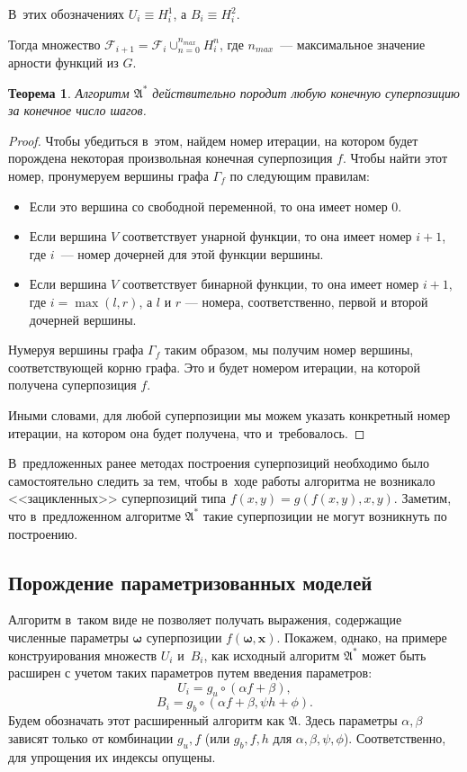 \documentclass[12pt,a4paper]{article}
\newtheorem{theorem}{Теорема}
\begin{document}
В~этих обозначениях $U_i \equiv H_i^1$, а $B_i \equiv H_i^2$.

Тогда множество $\mathcal{F}_{i+1} = \mathcal{F}_i \cup_{n=0}^{n_{max}} H_i^n$,
где $n_{max}$~--- максимальное значение арности функций из $G$.

\begin{theorem}
  Алгоритм $\mathfrak{A^*}$ действительно породит любую конечную суперпозицию
  за конечное число шагов.
\end{theorem}
\begin{proof}
  Чтобы убедиться в~этом, найдем номер итерации, на котором будет порождена
  некоторая произвольная конечная суперпозиция $f$. Чтобы найти этот номер,
  пронумеруем вершины графа $\Gamma_f$ по следующим правилам:
  \begin{itemize}
	\item Если это вершина со свободной переменной, то она имеет номер $0$.
	\item Если вершина $V$ соответствует унарной функции, то она имеет номер
	  $i+1$, где $i$~--- номер дочерней для этой функции вершины.
	\item Если вершина $V$ соответствует бинарной функции, то она имеет номер
	  $i+1$, где $i = \max (l, r)$, а $l$ и $r$ --- номера, соответственно,
	  первой и второй дочерней вершины.
  \end{itemize}

  Нумеруя вершины графа $\Gamma_f$ таким образом, мы получим номер вершины,
  соответствующей корню графа. Это и будет номером итерации, на которой получена
  суперпозиция $f$.
  
  Иными словами, для любой суперпозиции мы можем указать конкретный номер
  итерации, на котором она будет получена, что и~требовалось.
\end{proof}

В~предложенных ранее методах\cite{Zelinka2008} построения суперпозиций
необходимо было самостоятельно следить за тем, чтобы в~ходе работы алгоритма
не возникало <<зацикленных>> суперпозиций типа $f(x, y) = g (f(x, y), x, y)$.
Заметим, что в~предложенном алгоритме $\mathfrak{A^*}$ такие суперпозиции
не могут возникнуть по построению.

\subsection{Порождение параметризованных моделей}
Алгоритм в~таком виде не позволяет получать выражения, содержащие численные
параметры $\boldsymbol{\omega}$ суперпозиции $f(\boldsymbol{\omega}, \mathbf{x})$.
Покажем, однако, на примере конструирования множеств $U_i$ и~$B_i$, как
исходный алгоритм $\mathfrak{A^*}$ может быть расширен с учетом таких
параметров путем введения параметров:
\[
U_i = { g_u \circ (\alpha f + \beta) },
\]
\[
B_i = { g_b \circ (\alpha f + \beta, \psi h + \phi) }.
\]
Будем обозначать этот расширенный алгоритм как $\mathfrak{A}$. Здесь параметры
$\alpha, \beta$ зависят только от комбинации $g_u, f$ (или $g_b, f, h$ для
$\alpha, \beta, \psi, \phi$). Соответственно, для упрощения их индексы опущены.
\end{document}
